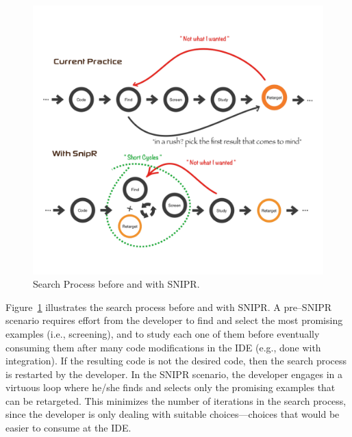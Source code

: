 \begin{figure}[!ht]
    \centering
    \includegraphics[width=\textwidth]{images/searchprocess}
    \caption{Search Process before and with \uppercase{SnipR}.}
    \label{fig:retargeting}
\end{figure}
\pagebreak

Figure~\ref{fig:retargeting} illustrates the search process before and with \uppercase{SnipR}. A pre--\uppercase{SnipR} scenario requires effort from the developer to find and select the most promising examples (i.e., screening), and to study each one of them before eventually consuming them after many code modifications in the IDE (e.g., done with integration). If the resulting code is not the desired code, then the search process is restarted by the developer. In the \uppercase{SnipR} scenario, the developer engages in a virtuous loop where he/she finds and selects only the promising examples that can be retargeted. This minimizes the number of iterations in the search process, since the developer is only dealing with suitable choices---choices that would be easier to consume at the IDE.


